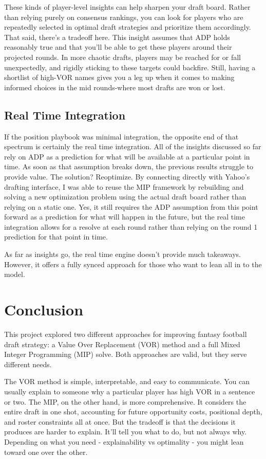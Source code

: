 \documentclass{article}
\begin{document}
These kinds of player-level insights can help sharpen your draft board. 
Rather than relying purely on consensus rankings, you can look for players who are repeatedly selected in optimal draft strategies and prioritize them accordingly.
That said, there's a tradeoff here. This insight assumes that ADP holds reasonably true and that you'll be able to get these players around their projected rounds. 
In more chaotic drafts, players may be reached for or fall unexpectedly, and rigidly sticking to these targets could backfire. 
Still, having a shortlist of high-VOR names gives you a leg up when it comes to making informed choices in the mid rounds-where most drafts are won or lost.

\subsection{Real Time Integration}
If the position playbook was minimal integration, the opposite end of that spectrum is certainly the real time integration.
All of the insights discussed so far rely on ADP as a prediction for what will be available at a particular point in time.
As soon as that assumption breaks down, the previous results struggle to provide value.
The solution? Reoptimize.
By connecting directly with Yahoo's drafting interface, I was able to reuse the MIP framework by rebuilding and solving a new optimization problem using the actual draft board rather than relying on a static one.
Yes, it still requires the ADP assumption from this point forward as a prediction for what will happen in the future, but the real time integration allows for a resolve at each round rather than relying on the round 1 prediction for that point in time.

As far as insights go, the real time engine doesn't provide much takeaways.
However, it offers a fully synced approach for those who want to lean all in to the model.


\section{Conclusion}
This project explored two different approaches for improving fantasy football draft strategy: a Value Over Replacement (VOR) method and a full Mixed Integer Programming (MIP) solve. 
Both approaches are valid, but they serve different needs.

The VOR method is simple, interpretable, and easy to communicate. 
You can usually explain to someone why a particular player has high VOR in a sentence or two. 
The MIP, on the other hand, is more comprehensive. 
It considers the entire draft in one shot, accounting for future opportunity costs, positional depth, and roster constraints all at once. 
But the tradeoff is that the decisions it produces are harder to explain. It'll tell you what to do, but not always why. 
Depending on what you need - explainability vs optimality - you might lean toward one over the other.
\end{document}
